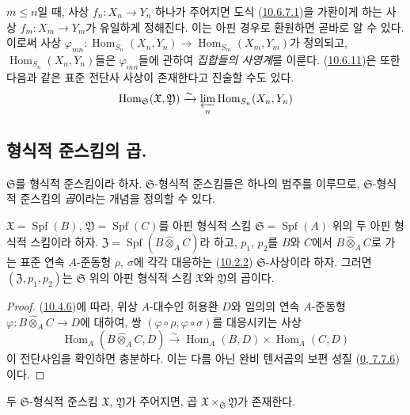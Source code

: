 $m\leq n$일 때, 사상 $f_n:X_n\to Y_n$ 하나가 주어지면
도식 (\hyperref[I.10.6.7.1-ko]{10.6.7.1})을 가환이게 하는 사상
$f_m:X_m\to Y_m$가 유일하게 정해진다. 이는 아핀 경우로 환원하면
곧바로 알 수 있다. 이로써 사상
$\varphi_{mn}:\operatorname{Hom}_{S_n}(X_n,Y_n)
\to\operatorname{Hom}_{S_m}(X_m,Y_m)$가 정의되고,
$\operatorname{Hom}_{S_n}(X_n,Y_n)$들은 $\varphi_{mn}$들에 관하여
\emph{집합들의 사영계}를 이룬다.
(\hyperref[I.10.6.11-ko]{10.6.11})은 또한 다음과 같은 표준 전단사 사상이
존재한다고 진술할 수도 있다.
\[
  \operatorname{Hom}_{\mathfrak{S}}(\mathfrak{X},\mathfrak{Y})
  \xrightarrow{\sim}
  \varprojlim_n\operatorname{Hom}_{S_n}(X_n,Y_n)
\]

\subsection{형식적 준스킴의 곱.}
\label{subsection:I.10.7-ko}

\begin{env}[10.7.1]
\label{I.10.7.1-ko}
$\mathfrak{S}$를 형식적 준스킴이라 하자.
$\mathfrak{S}$-형식적 준스킴들은 하나의 범주를 이루므로,
$\mathfrak{S}$-형식적 준스킴의 \emph{곱}이라는 개념을 정의할 수 있다.
\end{env}

\begin{proposition}[10.7.2]
\label{I.10.7.2-ko}
$\mathfrak{X}=\operatorname{Spf}(B)$,
$\mathfrak{Y}=\operatorname{Spf}(C)$를 아핀 형식적 스킴
$\mathfrak{S}=\operatorname{Spf}(A)$ 위의 두 아핀 형식적 스킴이라 하자.
$\mathfrak{Z}=\operatorname{Spf}(B\widehat{\otimes}_A C)$라 하고,
$p_1$, $p_2$를 $B$와 $C$에서
$B\widehat{\otimes}_A C$로 가는 표준 연속 $A$-준동형
$\rho$, $\sigma$에 각각 대응하는
(\hyperref[I.10.2.2-ko]{10.2.2}) $\mathfrak{S}$-사상이라 하자.
그러면 $(\mathfrak{Z},p_1,p_2)$는 $\mathfrak{S}$ 위의 아핀 형식적 스킴
$\mathfrak{X}$와 $\mathfrak{Y}$의 곱이다.
\end{proposition}

\begin{proof}
(\hyperref[I.10.4.6-ko]{10.4.6})에 따라, 위상 $A$-대수인 허용환 $D$와
임의의 연속 $A$-준동형
$\varphi:B\widehat{\otimes}_A C\to D$에 대하여, 쌍
$(\varphi\circ\rho,\varphi\circ\sigma)$를 대응시키는 사상
\[
  \operatorname{Hom}_A(B\widehat{\otimes}_A C,D)
  \xrightarrow{\sim}
  \operatorname{Hom}_A(B,D)\times\operatorname{Hom}_A(C,D)
\]
이 전단사임을 확인하면 충분하다. 이는 다름 아닌 완비 텐서곱의 보편 성질
(\hyperref[0.7.7.6-ko]{0, 7.7.6})이다.
\end{proof}

\begin{proposition}[10.7.3]
\label{I.10.7.3-ko}
두 $\mathfrak{S}$-형식적 준스킴 $\mathfrak{X}$,
$\mathfrak{Y}$가 주어지면, 곱
$\mathfrak{X}\times_{\mathfrak{S}}\mathfrak{Y}$가 존재한다.
\end{proposition}


